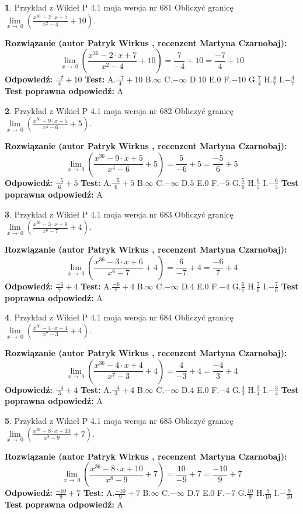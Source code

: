 \documentclass[12pt, a4paper]{article}
\theoremstyle{definition} %
\newtheorem{zad}{}
\newcommand{\zadStart}[1]{\begin{zad}#1\newline}
\newcommand{\zadStop}{\end{zad}}
\newcommand{\rozwStart}[2]{\noindent \textbf{Rozwiązanie (autor #1 , recenzent #2): }\newline}
\newcommand{\rozwStop}{\newline}
\newcommand{\odpStart}{\noindent \textbf{Odpowiedź:}\newline}
\newcommand{\odpStop}{\newline}
\newcommand{\testStart}{\noindent \textbf{Test:}\newline}
\newcommand{\testStop}{\newline}
\newcommand{\kluczStart}{\noindent \textbf{Test poprawna odpowiedź:}\newline}
\newcommand{\kluczStop}{\newline}
\begin{document}
\zadStart{Przykład z Wikieł P 4.1 moja wersja nr 681}
Obliczyć granicę $\lim\limits_{x\to\ 0}(\frac{x^{36}-2 \cdot x +7}{x^{2}-4}+10)$.
\zadStop
\rozwStart{Patryk Wirkus}{Martyna Czarnobaj}
$$\lim\limits_{x\to\ 0}(\frac{x^{36}-2 \cdot x +7}{x^{2}-4}+10)=\frac{7}{-4}+10=\frac{-7}{4}+10$$
\rozwStop
\odpStart
$\frac{-7}{4}+10$
\odpStop
\testStart
A.$\frac{-7}{4}+10$
B.$\infty$
C.$-\infty$
D.$10$
E.$0$
F.$-10$
G.$\frac{7}{4}$
H.$\frac{4}{7}$
I.$-\frac{4}{7}$
\testStop
\kluczStart
A
\kluczStop



\zadStart{Przykład z Wikieł P 4.1 moja wersja nr 682}
Obliczyć granicę $\lim\limits_{x\to\ 0}(\frac{x^{36}-9 \cdot x +5}{x^{4}-6}+5)$.
\zadStop
\rozwStart{Patryk Wirkus}{Martyna Czarnobaj}
$$\lim\limits_{x\to\ 0}(\frac{x^{36}-9 \cdot x +5}{x^{4}-6}+5)=\frac{5}{-6}+5=\frac{-5}{6}+5$$
\rozwStop
\odpStart
$\frac{-5}{6}+5$
\odpStop
\testStart
A.$\frac{-5}{6}+5$
B.$\infty$
C.$-\infty$
D.$5$
E.$0$
F.$-5$
G.$\frac{5}{6}$
H.$\frac{6}{5}$
I.$-\frac{6}{5}$
\testStop
\kluczStart
A
\kluczStop



\zadStart{Przykład z Wikieł P 4.1 moja wersja nr 683}
Obliczyć granicę $\lim\limits_{x\to\ 0}(\frac{x^{36}-3 \cdot x +6}{x^{6}-7}+4)$.
\zadStop
\rozwStart{Patryk Wirkus}{Martyna Czarnobaj}
$$\lim\limits_{x\to\ 0}(\frac{x^{36}-3 \cdot x +6}{x^{6}-7}+4)=\frac{6}{-7}+4=\frac{-6}{7}+4$$
\rozwStop
\odpStart
$\frac{-6}{7}+4$
\odpStop
\testStart
A.$\frac{-6}{7}+4$
B.$\infty$
C.$-\infty$
D.$4$
E.$0$
F.$-4$
G.$\frac{6}{7}$
H.$\frac{7}{6}$
I.$-\frac{7}{6}$
\testStop
\kluczStart
A
\kluczStop



\zadStart{Przykład z Wikieł P 4.1 moja wersja nr 684}
Obliczyć granicę $\lim\limits_{x\to\ 0}(\frac{x^{36}-4 \cdot x +4}{x^{7}-3}+4)$.
\zadStop
\rozwStart{Patryk Wirkus}{Martyna Czarnobaj}
$$\lim\limits_{x\to\ 0}(\frac{x^{36}-4 \cdot x +4}{x^{7}-3}+4)=\frac{4}{-3}+4=\frac{-4}{3}+4$$
\rozwStop
\odpStart
$\frac{-4}{3}+4$
\odpStop
\testStart
A.$\frac{-4}{3}+4$
B.$\infty$
C.$-\infty$
D.$4$
E.$0$
F.$-4$
G.$\frac{4}{3}$
H.$\frac{3}{4}$
I.$-\frac{3}{4}$
\testStop
\kluczStart
A
\kluczStop



\zadStart{Przykład z Wikieł P 4.1 moja wersja nr 685}
Obliczyć granicę $\lim\limits_{x\to\ 0}(\frac{x^{36}-8 \cdot x +10}{x^{8}-9}+7)$.
\zadStop
\rozwStart{Patryk Wirkus}{Martyna Czarnobaj}
$$\lim\limits_{x\to\ 0}(\frac{x^{36}-8 \cdot x +10}{x^{8}-9}+7)=\frac{10}{-9}+7=\frac{-10}{9}+7$$
\rozwStop
\odpStart
$\frac{-10}{9}+7$
\odpStop
\testStart
A.$\frac{-10}{9}+7$
B.$\infty$
C.$-\infty$
D.$7$
E.$0$
F.$-7$
G.$\frac{10}{9}$
H.$\frac{9}{10}$
I.$-\frac{9}{10}$
\testStop
\kluczStart
A
\kluczStop
\end{document}
